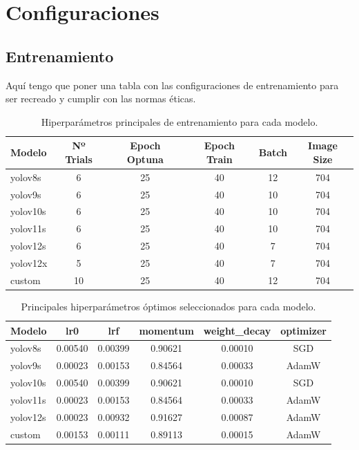 \documentclass[12pt,a4paper,onecolumn,oneside]{report}
\begin{document}
\section{Configuraciones}
\label{sec:Configuraciones}

\subsection{Entrenamiento}

Aquí tengo que poner una tabla con las configuraciones de entrenamiento para ser recreado y cumplir con las normas éticas.

\begin{table}[H]
\centering
\begin{tabular}{|l|c|c|c|c|c|}
\hline
\textbf{Modelo} & \textbf{Nº Trials} & \textbf{Epoch Optuna} & \textbf{Epoch Train} & \textbf{Batch} & \textbf{Image Size} \\
\hline
yolov8s   & 6  & 25 & 40 & 12 & 704 \\
yolov9s   & 6  & 25 & 40 & 10 & 704 \\
yolov10s  & 6  & 25 & 40 & 10 & 704 \\
yolov11s  & 6  & 25 & 40 & 10 & 704 \\
yolov12s  & 6  & 25 & 40 & 7 & 704 \\
yolov12x  & 5  & 25 & 40 & 7 & 704 \\
custom    & 10 & 25 & 40 & 12 & 704 \\
\hline
\end{tabular}
\caption{Hiperparámetros principales de entrenamiento para cada modelo.}
\end{table}


\begin{table}[H]
\centering
\begin{tabular}{|l|c|c|c|c|c|}
\hline
\textbf{Modelo} & \textbf{lr0} & \textbf{lrf} & \textbf{momentum} & \textbf{weight\_decay} & \textbf{optimizer} \\
\hline
yolov8s   & 0.00540 & 0.00399 & 0.90621 & 0.00010 & SGD \\ \hline
yolov9s   & 0.00023 & 0.00153 & 0.84564 & 0.00033 & AdamW \\
yolov10s  & 0.00540 & 0.00399 & 0.90621 & 0.00010 & SGD \\
yolov11s  & 0.00023 & 0.00153 & 0.84564 & 0.00033 & AdamW \\
yolov12s  & 0.00023 & 0.00932 & 0.91627 & 0.00087 & AdamW \\
custom    & 0.00153 & 0.00111 & 0.89113 & 0.00015 & AdamW \\
\hline
\end{tabular}
\caption{Principales hiperparámetros óptimos seleccionados para cada modelo.}
\end{table}
\end{document}
